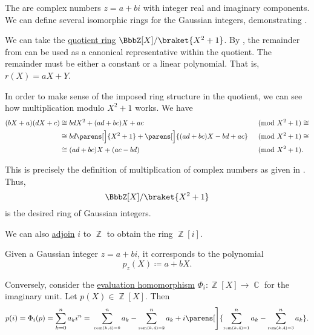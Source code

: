 \begin{example}\label{ex:gaussian_integers}
  The  are complex numbers \( z = a + bi \) with integer real and imaginary components. We can define several isomorphic rings for the Gaussian integers, demonstrating .

  \begin{thmenum}
     We can take the \hyperref[def:ring/quotient]{quotient ring} \( \BbbZ[X] / \braket{X^2 + 1} \). By , the remainder from  can be used as a canonical representative within the quotient. The remainder must be either a constant or a linear polynomial. That is, \( r(X) = aX + Y \).

    In order to make sense of the imposed ring structure in the quotient, we can see how multiplication modulo \( X^2 + 1 \) works. We have
    \begin{align*}
      (bX + a) (dX + c)
      &\cong
      bdX^2 + (ad + bc)X + ac
      &\pmod {X^2 + 1} \cong \\ &\cong
      bd\parens[\Big]{ X^2 + 1 } + \parens[\Big]{ (ad + bc)X - bd + ac }
      &\pmod {X^2 + 1} \cong \\ &\cong
      (ad + bc)X + (ac - bd)
      &\pmod {X^2 + 1}. \phantom{\cong}
    \end{align*}

    This is precisely the definition of multiplication of complex numbers as given in . Thus,
    \begin{equation*}
      \BbbZ[X] / \braket{X^2 + 1}
    \end{equation*}
    is the desired ring of Gaussian integers.

     We can also \hyperref[thm:adjoining_elements_to_semiring]{adjoin} \( i \) to \( \BbbZ \) to obtain the ring \( \BbbZ[i] \).

    Given a Gaussian integer \( z = a + bi \), it corresponds to the polynomial
    \begin{equation*}
      p_z(X) \coloneqq a + bX.
    \end{equation*}

    Conversely, consider the \hyperref[thm:polynomial_algebra_universal_property]{evaluation homomorphism} \( \Phi_i: \BbbZ[X] \to \BbbC \) for the imaginary unit. Let \( p(X) \in \BbbZ[X] \). Then
    \begin{equation*}
      p(i)
      =
      \Phi_i(p)
      =
      \sum_{k=0}^n a_k i^n
      =
      \thickspace \sum_{\scriptscriptstyle{\rem(k, 4) = 0}}^n a_k - \sum_{\scriptscriptstyle{\rem(k, 4) = 2}}^n a_k + i \parens[\Bigg]{ \sum_{\scriptscriptstyle{\rem(k, 4) = 1}}^n a_k - \sum_{\scriptscriptstyle{\rem(k, 4) = 3}}^n a_k }.
    \end{equation*}


\end{thmenum}
\end{example}
